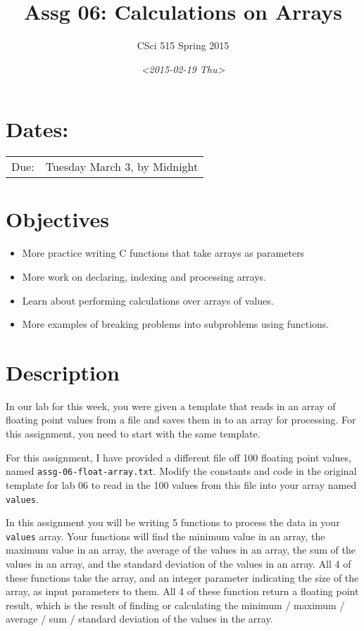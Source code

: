 \documentclass[11pt]{article}
\author{CSci 515 Spring 2015}
\date{\textit{<2015-02-19 Thu>}}
\title{Assg 06: Calculations on Arrays}
\begin{document}
\maketitle

\section*{Dates:}
\label{sec-1}
\begin{center}
\begin{tabular}{ll}
Due: & Tuesday March 3, by Midnight\\
\end{tabular}
\end{center}
\section*{Objectives}
\label{sec-2}
\begin{itemize}
\item More practice writing C functions that take arrays as parameters
\item More work on declaring, indexing and processing arrays.
\item Learn about performing calculations over arrays of values.
\item More examples of breaking problems into subproblems using functions.
\end{itemize}
\section*{Description}
\label{sec-3}
In our lab for this week, you were given a template that reads in an array
of floating point values from a file and saves them in to an array for processing.
For this assignment, you need to start with the same template.

For this assignment, I have provided a different file off 100 floating
point values, named \verb~assg-06-float-array.txt~.  Modify the constants and
code in the original template for lab 06 to read in the 100 values
from this file into your array named \verb~values~.

In this assignment you will be writing 5 functions to process the data
in your \verb~values~ array.  Your functions will find the minimum value in
an array, the maximum value in an array, the average of the values in
an array, the sum of the values in an array, and the standard deviation
of the values in an array.  All 4 of these functions take the array,
and an integer parameter indicating the size of the array, as input
parameters to them.  All 4 of these function return a floating point
result, which is the result of finding or calculating the minimum /
maximum / average / sum / standard deviation of the values in the array.
\end{document}

